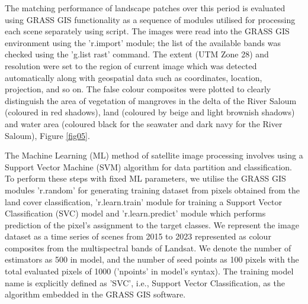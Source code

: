 \documentclass[earth,article,submit,pdftex,moreauthors]{Definitions/mdpi}
\begin{document}
The matching performance of landscape patches over this period is evaluated using GRASS GIS functionality as a sequence of modules utilised for processing each scene separately using script. The images were read into the GRASS GIS environment using the 'r.import' module; the list of the available bands was checked using the 'g.list rast' command. The extent (UTM Zone 28) and resolution were set to the region of current image which was detected automatically along with geospatial data {such as }coordinates, location, projection, {and so on}. The {false} colour composites were plotted to clearly distinguish the area of vegetation of mangroves in the delta of the River Saloum (coloured in red shadows), land (coloured by beige and light brownish shadows) and water area (coloured black for the seawater and dark navy for the River Saloum), Figure \ref{fig05}. 

{The Machine Learning (ML) method of satellite image processing involves using a Support Vector Machine (SVM) algorithm for data partition and classification. To perform these steps with fixed ML parameters, we utilise the GRASS GIS modules 'r.random' for generating training dataset from pixels obtained from the land cover classification, 'r.learn.train' module for training a Support Vector Classification (SVC) model and 'r.learn.predict' module which performs prediction of the pixel's assignment to the target classes. We represent the image dataset as a time series of scenes from 2015 to 2023 represented as colour composites from the multispectral bands of Landsat. We denote the number of estimators as 500 in model, and the number of seed points as 100 pixels with the total evaluated pixels of 1000 ('npoints' in model's syntax). The training model name is explicitly defined as 'SVC', i.e., Support Vector Classification, as the algorithm embedded in the GRASS GIS software.}
\end{document}
